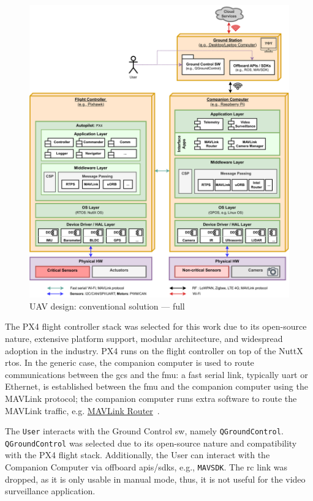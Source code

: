 \begin{figure}[!hbt]
  \centering
  \includegraphics[width=1.0\textwidth]{./img/pdf/uav-main-design-conv-sol-1.pdf} 
%   
  \caption{UAV design: conventional solution --- full}%
  \label{fig:uav-design-conv-sol-1}
\end{figure}

The PX4 flight controller stack was selected for this work due to its
open-source nature, extensive platform support, modular architecture, and
widespread adoption in the industry. PX4 runs on the flight controller on top of
the NuttX \gls{rtos}. In the generic case, the companion computer is used to
route communications between the \gls{gcs} and the \gls{fmu}: a fast serial
link, typically \gls{uart} or Ethernet, is established between the \gls{fmu} and
the companion computer using the MAVLink protocol; the companion computer
runs extra software to route the MAVLink traffic,
e.g. \href{https://github.com/mavlink-router/mavlink-router}{MAVLink
  Router}~\cite{px4-routers}.

The \texttt{User} interacts with the Ground Control \gls{sw}, namely
\texttt{QGroundControl}. \texttt{QGroundControl} was selected due to its
open-source nature and compatibility with the PX4 flight stack. Additionally,
the User can interact with the Companion Computer via offboard
\glspl{api}/\glspl{sdk}, e.g., \texttt{MAVSDK}. The \gls{rc} link was dropped,
as it is only usable in manual mode, thus, it is not useful for the video
surveillance application.

